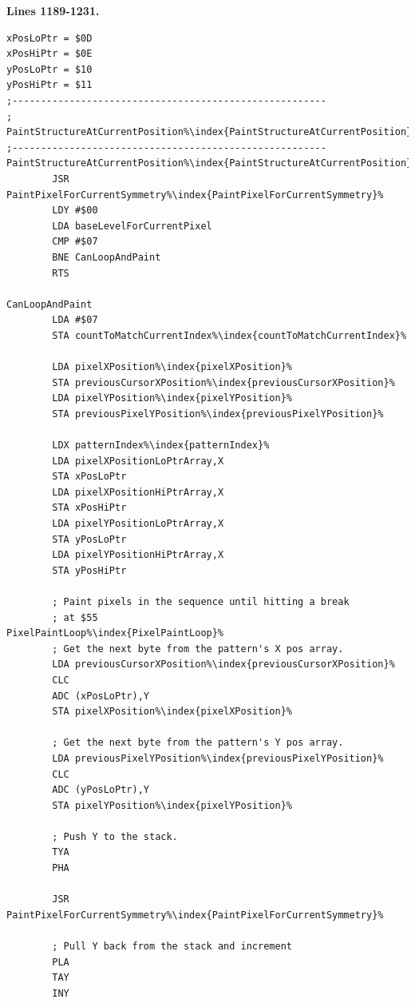 \clearpage
\textbf{Lines 1189-1231. } 
\begin{lstlisting}[basicstyle=\ttfamily\scriptsize, caption=The routine responsible for painting patterns.,escapechar=\%]
xPosLoPtr = $0D
xPosHiPtr = $0E
yPosLoPtr = $10
yPosHiPtr = $11
;-------------------------------------------------------
; PaintStructureAtCurrentPosition%\index{PaintStructureAtCurrentPosition}%
;-------------------------------------------------------
PaintStructureAtCurrentPosition%\index{PaintStructureAtCurrentPosition}%   
        JSR PaintPixelForCurrentSymmetry%\index{PaintPixelForCurrentSymmetry}%
        LDY #$00
        LDA baseLevelForCurrentPixel
        CMP #$07
        BNE CanLoopAndPaint
        RTS 

CanLoopAndPaint   
        LDA #$07
        STA countToMatchCurrentIndex%\index{countToMatchCurrentIndex}%

        LDA pixelXPosition%\index{pixelXPosition}%
        STA previousCursorXPosition%\index{previousCursorXPosition}%
        LDA pixelYPosition%\index{pixelYPosition}%
        STA previousPixelYPosition%\index{previousPixelYPosition}%

        LDX patternIndex%\index{patternIndex}%
        LDA pixelXPositionLoPtrArray,X
        STA xPosLoPtr
        LDA pixelXPositionHiPtrArray,X
        STA xPosHiPtr
        LDA pixelYPositionLoPtrArray,X
        STA yPosLoPtr
        LDA pixelYPositionHiPtrArray,X
        STA yPosHiPtr

        ; Paint pixels in the sequence until hitting a break
        ; at $55
PixelPaintLoop%\index{PixelPaintLoop}%   
        ; Get the next byte from the pattern's X pos array.
        LDA previousCursorXPosition%\index{previousCursorXPosition}%
        CLC 
        ADC (xPosLoPtr),Y
        STA pixelXPosition%\index{pixelXPosition}%

        ; Get the next byte from the pattern's Y pos array.
        LDA previousPixelYPosition%\index{previousPixelYPosition}%
        CLC 
        ADC (yPosLoPtr),Y
        STA pixelYPosition%\index{pixelYPosition}%

        ; Push Y to the stack.
        TYA 
        PHA 

        JSR PaintPixelForCurrentSymmetry%\index{PaintPixelForCurrentSymmetry}%

        ; Pull Y back from the stack and increment
        PLA 
        TAY 
        INY 
\end{lstlisting}
\clearpage

